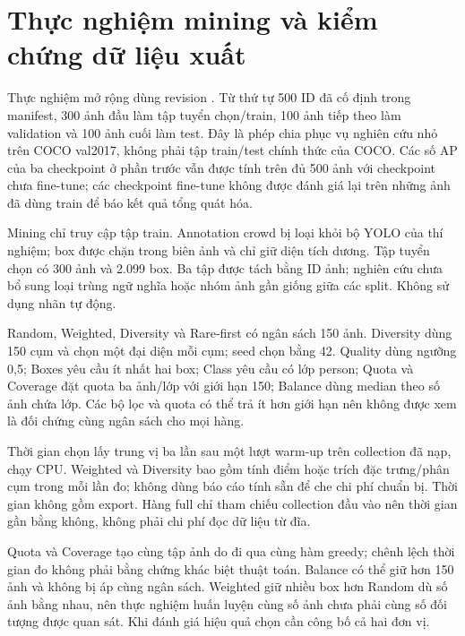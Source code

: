 \section{Thực nghiệm mining và kiểm chứng dữ liệu xuất}
\label{sec:mining-exp}
Thực nghiệm mở rộng dùng revision . Từ thứ tự 500 ID đã cố định trong manifest, 300 ảnh đầu làm tập tuyển chọn/train, 100 ảnh tiếp theo làm validation và 100 ảnh cuối làm test. Đây là phép chia phục vụ nghiên cứu nhỏ trên COCO val2017, không phải tập train/test chính thức của COCO. Các số AP của ba checkpoint ở phần trước vẫn được tính trên đủ 500 ảnh với checkpoint chưa fine-tune; các checkpoint fine-tune không được đánh giá lại trên những ảnh đã dùng train để báo kết quả tổng quát hóa.

Mining chỉ truy cập tập train. Annotation crowd bị loại khỏi bộ YOLO của thí nghiệm; box được chặn trong biên ảnh và chỉ giữ diện tích dương. Tập tuyển chọn có 300 ảnh và 2.099 box. Ba tập được tách bằng ID ảnh; nghiên cứu chưa bổ sung loại trùng ngữ nghĩa hoặc nhóm ảnh gần giống giữa các split. Không sử dụng nhãn tự động.

Random, Weighted, Diversity và Rare-first có ngân sách 150 ảnh. Diversity dùng 150 cụm và chọn một đại diện mỗi cụm; seed chọn bằng 42. Quality dùng ngưỡng 0,5; Boxes yêu cầu ít nhất hai box; Class yêu cầu có lớp person; Quota và Coverage đặt quota ba ảnh/lớp với giới hạn 150; Balance dùng median theo số ảnh chứa lớp. Các bộ lọc và quota có thể trả ít hơn giới hạn nên không được xem là đối chứng cùng ngân sách cho mọi hàng.

Thời gian chọn lấy trung vị ba lần sau một lượt warm-up trên collection đã nạp, chạy CPU. Weighted và Diversity bao gồm tính điểm hoặc trích đặc trưng/phân cụm trong mỗi lần đo; không dùng báo cáo tính sẵn để che chi phí chuẩn bị. Thời gian không gồm export. Hàng full chỉ tham chiếu collection đầu vào nên thời gian gần bằng không, không phải chi phí đọc dữ liệu từ đĩa.

\begin{table}[H]\centering\small
\caption{Benchmark tuyển chọn trên 300 ảnh; IR chỉ tính các lớp hiện diện}

\end{table}
Quota và Coverage tạo cùng tập ảnh do đi qua cùng hàm greedy; chênh lệch thời gian đo không phải bằng chứng khác biệt thuật toán. Balance có thể giữ hơn 150 ảnh và không bị áp cùng ngân sách. Weighted giữ nhiều box hơn Random dù số ảnh bằng nhau, nên thực nghiệm huấn luyện cùng số ảnh chưa phải cùng số đối tượng được quan sát. Khi đánh giá hiệu quả chọn cần công bố cả hai đơn vị.

